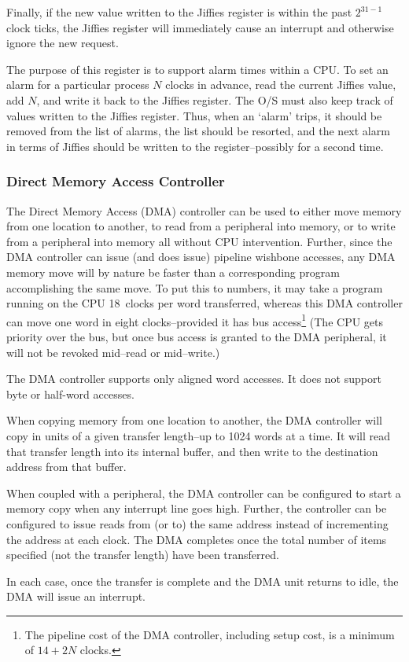 \documentclass{gqtekspec}
\begin{document}
Finally, if the new value written to the Jiffies register is within the past
$2^{31-1}$ clock ticks, the Jiffies register will immediately cause an interrupt
and otherwise ignore the new request.

The purpose of this register is to support alarm times within a CPU.  To
set an alarm for a particular process $N$ clocks in advance, read the current
Jiffies value, add $N$, and write it back to the Jiffies register.  The
O/S must also keep track of values written to the Jiffies register.  Thus,
when an `alarm' trips, it should be removed from the list of alarms, the list
should be resorted, and the next alarm in terms of Jiffies should be written
to the register--possibly for a second time.
\subsubsection{Direct Memory Access Controller}
The Direct Memory Access (DMA) controller can be used to either move memory
from one location to another, to read from a peripheral into memory, or to
write from a peripheral into memory all without CPU intervention.  Further,
since the DMA controller can issue (and does issue) pipeline wishbone accesses,
any DMA memory move will by nature be faster than a corresponding program
accomplishing the same move.  To put this to numbers, it may take a program
running on the CPU 18~clocks per word transferred, whereas this DMA controller
can move one word in eight clocks--provided it has bus
access\footnote{The pipeline cost of the DMA controller, including setup cost,
is a minimum of $14+2N$ clocks.} (The CPU gets priority over the bus, but once
bus access is granted to the DMA peripheral, it will not be revoked mid--read
or mid--write.)

The DMA controller supports only aligned word accesses.  It does not support
byte or half-word accesses.

When copying memory from one location to another, the DMA controller will
copy in units of a given transfer length--up to 1024 words at a time.  It will
read that transfer length into its internal buffer, and then write to the
destination address from that buffer.

When coupled with a peripheral, the DMA controller can be configured to start
a memory copy when any interrupt line goes high.  Further, the controller can
be configured to issue reads from (or to) the same address instead of
incrementing the address at each clock.  The DMA completes once the total
number of items specified (not the transfer length) have been transferred.

In each case, once the transfer is complete and the DMA unit returns to
idle, the DMA will issue an interrupt.
\end{document}
